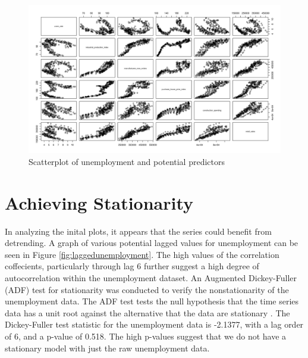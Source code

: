 \documentclass[twoside,twocolumn]{article}
\begin{document}
			\begin{figure}[H]
		\centering
		\caption{Scatterplot of unemployment and potential predictors}
		\label{fig:pred_scatt}
		\includegraphics[width=\linewidth]{images/pred_scatt}
	\end{figure}
	



\section{Achieving Stationarity}

In analyzing the inital plots, it appears that the series could benefit from detrending. A graph of various potential lagged values for unemployment can be seen in Figure \ref{fig:laggedunemployment}. The high values of the correlation coffecients, particularly through lag 6 further suggest a high degree of autocorrelation within the unemployment dataset.    An Augmented Dickey-Fuller (ADF) test for stationarity was conducted to verify the nonstationarity of the unemployment data.  The ADF test tests the null hypothesis that the time series data has a unit root against the alternative that the data are stationary \citep{Shumway2006}. The Dickey-Fuller test statistic for the unemployment data is -2.1377, with a lag order of 6, and a p-value of 0.518. The high p-values suggest that we do not have a stationary model with just the raw unemployment data.
			
\end{document}
